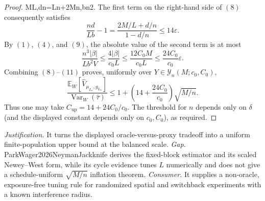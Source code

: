 \documentclass{article}
\begin{document}
\begin{proof}
ML\varepsilon,\qquad \frac dn=\frac Ln+2\frac Mn\varepsilon,\qquad b\ge\frac n2.\] The first term on the right-hand side of \((8)\) consequently satisfies \[\frac{nd}{Lb}-1=\frac{2M/L+d/n}{1-d/n}\le14\varepsilon.\tag{10}\] By \((1)\), \((4)\), and \((9)\), the absolute value of the second term is at most \[\frac{n^3|\beta|}{Lb^2V}\le\frac{4|\beta|}{c_0L}\le\frac{12C_0M}{c_0L}\le\frac{24C_0}{c_0}\varepsilon.\tag{11}\] Combining \((8)\)--\((11)\) proves, uniformly over \(Y\in\mathcal Y_n(M;c_0,C_0)\), \[\frac{\mathbb E_W[\widehat V_{\mu_{L_\star},g_{L_\star}}]}{\operatorname{Var}_W(\widehat\tau)}\le1+\left(14+\frac{24C_0}{c_0}\right)\sqrt{M/n}.\] Thus one may take \(C_{\mathrm{up}}=14+24C_0/c_0\). The threshold for \(n\) depends only on \(\delta\) (and the displayed constant depends only on \(c_0,C_0\)), as required.
\end{proof}
\par\smallskip\noindent \textit{Justification.} It turns the displayed oracle-versus-proxy tradeoff into a uniform finite-population upper bound at the balanced scale. \textit{Gap.} ParkWager2026NeymanJackknife derives the fixed-block estimator and its scaled Newey--West form, while its cycle evidence tunes \(L\) numerically and does not give a schedule-uniform \(\sqrt{M/n}\) inflation theorem. \textit{Consumer.} It supplies a non-oracle, exposure-free tuning rule for randomized spatial and switchback experiments with a known interference radius.
\end{document}
